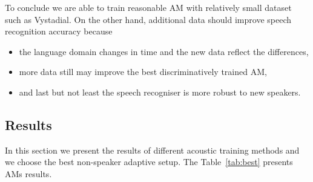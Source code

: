 To conclude we are able to train reasonable \ac{AM} with relatively small dataset such as Vystadial.
On the other hand, additional data should improve speech recognition accuracy because
\begin{itemize}
    \item the language domain changes in time and the new data reflect the differences,
    \item more data still may improve the best discriminatively trained \ac{AM},
    \item and last but not least the speech recogniser is more robust to new speakers.
\end{itemize}

\subsection{Results}
\label{sec:results}
In this section we present the results of different acoustic training methods and we choose the best non-speaker adaptive setup.
The Table~\ref{tab:best} presents \acp{AM} results. 

